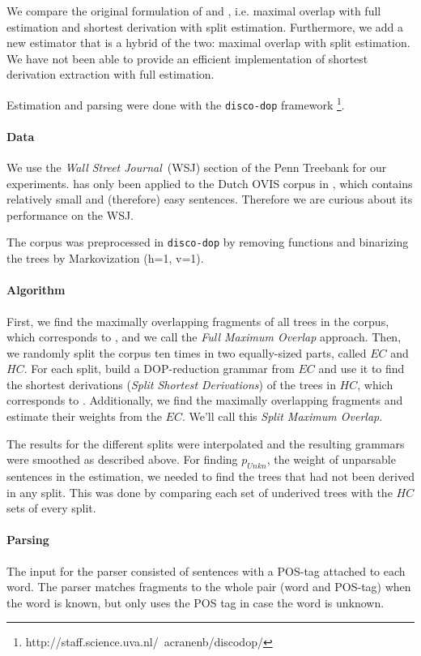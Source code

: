 We compare the original formulation of \ddop{} and \dops{}, i.e. maximal overlap with full estimation and shortest derivation with split estimation. Furthermore, we add a new estimator that is a hybrid of the two: maximal overlap with split estimation. We have not been able to provide an efficient  implementation of shortest derivation extraction with full estimation.


Estimation and parsing were done with the {\tt disco-dop} framework \footnote{http://staff.science.uva.nl/~acranenb/discodop/}.


\paragraph{Data}
We use the \emph{Wall Street Journal}~(WSJ) section of the Penn Treebank for our experiments. \dops{} has only been applied to the Dutch OVIS corpus in \cite{zollmann2005}, which contains relatively small and (therefore) easy sentences. Therefore we are curious about its performance on the WSJ.

The corpus was preprocessed in {\tt disco-dop} by removing functions and binarizing the trees by Markovization (h=1, v=1). %

\paragraph{Algorithm}
First, we find the maximally overlapping fragments of all trees in the corpus, which corresponds to \ddop, and we call the \emph{Full Maximum Overlap} approach.
Then, we randomly split the corpus ten times in two equally-sized parts, called $EC$ and $HC$. For each split, build a DOP-reduction grammar from $EC$ and use it to find the shortest derivations (\emph{Split Shortest Derivations}) of the trees in $HC$, which corresponds to \dops{}. Additionally, we find the maximally overlapping fragments and estimate their weights from the $EC$. We'll call this \emph{Split Maximum Overlap}.

The results for the different splits were interpolated and the resulting grammars were smoothed as described above. For finding $p_{Unkn}$, the weight of unparsable sentences in the \dops{} estimation, we needed to find the trees that had not been derived in any split. This was done by comparing each set of underived trees with the $HC$ sets of every split.

\paragraph{Parsing}
The input for the parser consisted of sentences with a POS-tag attached to each word. The parser matches fragments to the whole pair (word and POS-tag) when the word is known, but only uses the POS tag in case the word is unknown.


